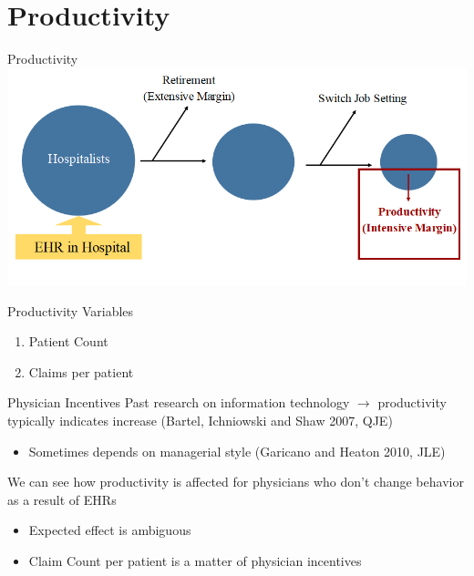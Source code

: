 \documentclass[10pt]{beamer}
\begin{document}
\section{Productivity}





\begin{frame}{Productivity}
    \centering
    \includegraphics[scale=.45]{Objects/EHR_FlowChart_Productivity.PNG}
\end{frame}

\begin{frame}{Productivity Variables}
    \begin{enumerate}
        \item Patient Count
        \vspace{6mm}
        \item Claims per patient
    \end{enumerate}
\end{frame}

\begin{frame}{Physician Incentives}
Past research on information technology $\rightarrow$ productivity typically indicates increase \tiny (Bartel, Ichniowski and Shaw 2007, QJE)
\vspace{3mm}
\begin{itemize}
    \normalsize \item Sometimes depends on managerial style \tiny(Garicano and Heaton 2010, JLE)
\end{itemize}

\vspace{6mm}

\normalsize We can see how productivity is affected for physicians who don't change behavior as a result of EHRs
\vspace{3mm}
    \begin{itemize}
        \item Expected effect is ambiguous
        \vspace{3mm}
        \item Claim Count per patient is a matter of physician incentives
    \end{itemize}
\end{frame}
\end{document}
